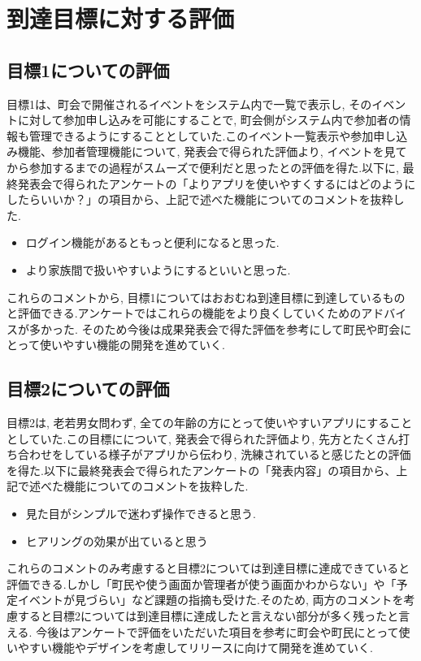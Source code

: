 \chapter{到達目標に対する評価}

\section{目標1についての評価}
目標1は、町会で開催されるイベントをシステム内で一覧で表示し, そのイベントに対して参加申し込みを可能にすることで, 町会側がシステム内で参加者の情報も管理できるようにすることとしていた.このイベント一覧表示や参加申し込み機能、参加者管理機能について, 発表会で得られた評価より, イベントを見てから参加するまでの過程がスムーズで便利だと思ったとの評価を得た.以下に, 最終発表会で得られたアンケートの「よりアプリを使いやすくするにはどのようにしたらいいか？」の項目から、上記で述べた機能についてのコメントを抜粋した.

\begin{itemize}
    \item ログイン機能があるともっと便利になると思った.
    \item より家族間で扱いやすいようにするといいと思った.
\end{itemize}

これらのコメントから, 目標1についてはおおむね到達目標に到達しているものと評価できる.アンケートではこれらの機能をより良くしていくためのアドバイスが多かった. そのため今後は成果発表会で得た評価を参考にして町民や町会にとって使いやすい機能の開発を進めていく.
\section{目標2についての評価}
目標2は, 老若男女問わず, 全ての年齢の方にとって使いやすいアプリにすることとしていた.この目標にについて, 発表会で得られた評価より, 先方とたくさん打ち合わせをしている様子がアプリから伝わり, 洗練されていると感じたとの評価を得た.以下に最終発表会で得られたアンケートの「発表内容」の項目から、上記で述べた機能についてのコメントを抜粋した.

\begin{itemize}
    \item 見た目がシンプルで迷わず操作できると思う.
    \item ヒアリングの効果が出ていると思う
\end{itemize}

これらのコメントのみ考慮すると目標2については到達目標に達成できていると評価できる.しかし「町民や使う画面か管理者が使う画面かわからない」や「予定イベントが見づらい」など課題の指摘も受けた.そのため, 両方のコメントを考慮すると目標2については到達目標に達成したと言えない部分が多く残ったと言える.
今後はアンケートで評価をいただいた項目を参考に町会や町民にとって使いやすい機能やデザインを考慮してリリースに向けて開発を進めていく.
